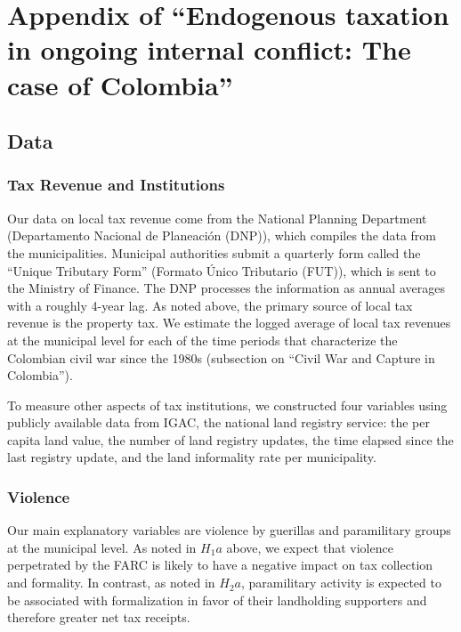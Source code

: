 \chapter{Appendix of ``Endogenous taxation in ongoing internal conflict: The case of Colombia'' \label{chap:append3}}

\section{Data \label{data_appendix3}}

\subsection{Tax Revenue and Institutions \label{appendix3:taxrevenues&institutions}}

Our data on local tax revenue come from the National Planning Department (Departamento Nacional de Planeaci\'{o}n (DNP)), which compiles the data from the municipalities. Municipal authorities submit a quarterly form called the ``Unique Tributary Form'' (Formato \'Unico Tributario (FUT)), which is sent to the Ministry of Finance. The DNP processes the information as annual averages with a roughly 4-year lag. As noted above, the primary source of local tax revenue is the property tax. We estimate the logged average of local tax revenues at the municipal level for each of the time periods that characterize the Colombian civil war since the 1980s (subsection on ``Civil War and Capture in Colombia''). 

To measure other aspects of tax institutions, we constructed four variables using publicly available data from IGAC, the national land registry service: the per capita land value, the number of land registry updates, the time elapsed since the last registry update, and the land informality rate per municipality. 

\subsection{Violence \label{appendix3:violence}}

Our main explanatory variables are violence by guerillas and paramilitary groups at the municipal level. As noted in $H_1a$ above, we expect that violence perpetrated by the FARC is likely to have a  negative impact on tax collection and formality. In contrast, as noted in $H_2a$, paramilitary activity is expected to be associated with formalization in favor of their landholding supporters and therefore greater net tax receipts.

